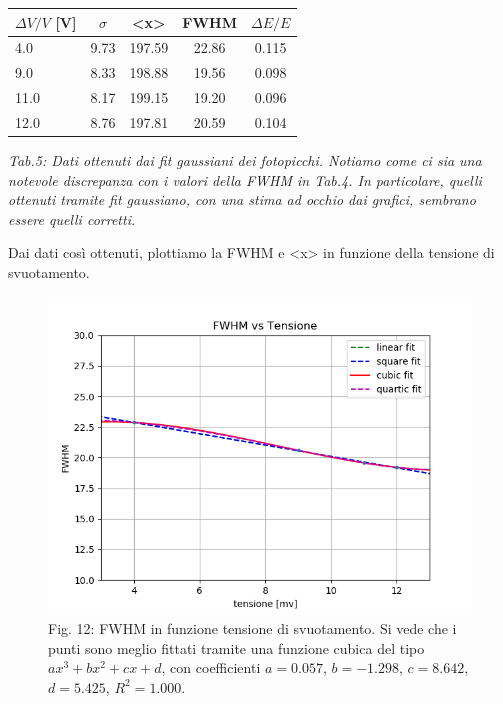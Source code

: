 \documentclass[a4paper]{article}
\begin{document}
\begin{center} 
		
		\begin{tabular}{lcccc}
			\hline
			\hline
			\textbf{$\Delta V/V$} [V]   &     \textbf{$\sigma$}	 &     \textbf{<x>} &     \textbf{FWHM} & \textbf{$\Delta E/E$}	 \\
			\hline
			\hline
				       4.0              &		9.73			 &		197.59		&		 22.86	& 	0.115		\\
				       9.0             &		8.33			 &		198.88			&	 19.56	&	0.098 	\\
				       11.0		        &		8.17			 &		199.15			&	 19.20	&	0.096 		\\
				       12.0		        & 		8.76			 &		197.81			&	 20.59	&	0.104	 	\\
			\hline
			\hline
		\end{tabular}
		\linebreak
		\emph{Tab.5: Dati ottenuti dai fit gaussiani dei fotopicchi. Notiamo come ci sia una notevole discrepanza con i valori della FWHM in Tab.4. In particolare, quelli ottenuti tramite fit gaussiano, con una stima ad occhio dai grafici, sembrano essere quelli corretti. } 
	\end{center}
	
Dai dati così ottenuti, plottiamo la FWHM e <x> in funzione della tensione di svuotamento.

\begin{figure}[!h]
\includegraphics[width=1\textwidth]{FWHM_vs_Tensione}
        \caption{Fig. 12: FWHM in funzione tensione di svuotamento. Si vede che i punti sono meglio fittati tramite una funzione cubica del tipo $ax^3+bx^2+cx+d$, con coefficienti $a=0.057$, $b=-1.298$, $c=8.642$, $d=5.425$, $R^2= 1.000$.}
        \label{fig:12}
\end{figure}
\end{document}
